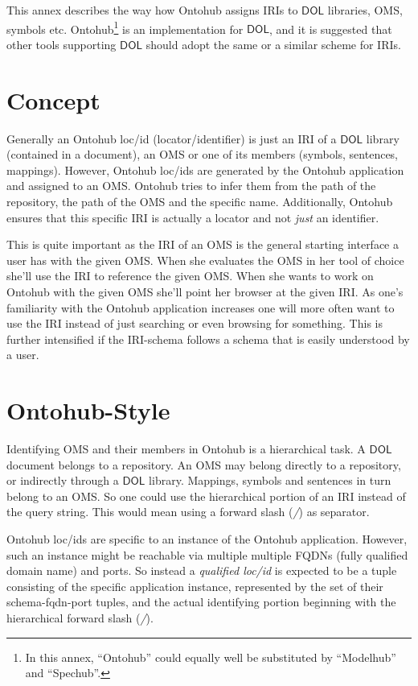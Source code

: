 \documentclass[10pt,fleqn,final]{scrreprt}
\newcommand{\cbs}[0]{\color{red}\xspace} %
\newcommand{\cbe}[0]{\color{black}\xspace} %
\newcommand*{\DOL}{\ensuremath{\mathsf{DOL}}\xspace}
\begin{document}
This annex describes the way how Ontohub assigns IRIs to \DOL
libraries, OMS, symbols etc. Ontohub\footnote{In this annex,
  ``Ontohub'' could equally well be substituted by ``Modelhub'' and
  ``Spechub''.} is \cbs an implementation \cbe for \DOL, and it is
suggested that other tools supporting \DOL should adopt the same or a
similar scheme for IRIs.


\section{Concept}

Generally an Ontohub loc/id (locator/identifier) is just an IRI of a
\DOL library (contained in a document), an OMS
or one of its members (symbols, sentences, mappings). However,
Ontohub loc/ids are generated by the Ontohub application and assigned to an
OMS.\cbs Ontohub tries to\cbe infer them from the path of the repository, the path of
the OMS and the specific name. Additionally,\cbs Ontohub ensures\cbe that this specific
IRI is actually a locator and not \emph{just} an identifier.

This is quite important as the IRI of an OMS is the general starting
interface a user has with the given OMS. When she evaluates the OMS
in her tool of choice she'll use the IRI to reference the given OMS. When
she wants to work on Ontohub with the given OMS she'll point her browser
at the given IRI. As\cbs one's\cbe familiarity with the Ontohub application increases one
will more often want to use the IRI instead of just searching or even browsing
for something.  This is further intensified if the IRI-schema follows a schema
that is easily understood by a user.

\section{Ontohub-Style}

Identifying OMS and their members in Ontohub is a hierarchical
task. A \DOL document belongs to a repository. An OMS may belong
directly to a repository, or indirectly through a \DOL library. Mappings,
symbols and sentences in turn belong to an OMS. So\cbs one\cbe could use the
hierarchical portion of an IRI instead of the query string.  This
would mean using a forward slash (\emph{/}) as separator.

Ontohub loc/ids are specific to an instance of the Ontohub application. However,
such an instance might be reachable via multiple multiple FQDNs (fully
qualified domain name) and ports. So instead\cbs a
\emph{qualified loc/id} is expected\cbe to be a tuple consisting of the specific application
instance, represented by the set of their schema-fqdn-port tuples, and the
actual identifying portion beginning with the hierarchical forward slash
(\emph{/}).
\end{document}
